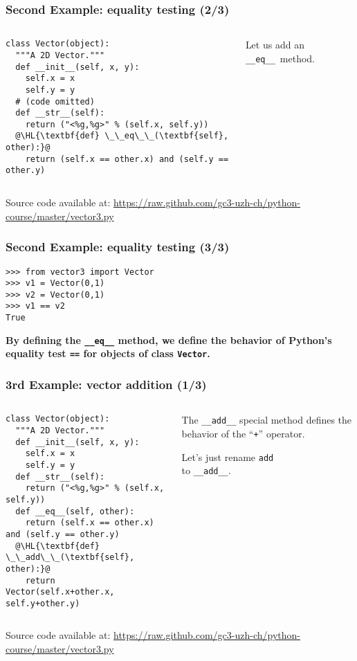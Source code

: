 \documentclass[english,serif,mathserif,xcolor=pdftex,dvipsnames,table]{beamer}
\begin{document}
\begin{frame}[fragile]
  \frametitle{Second Example: equality testing (2/3)}
  \begin{columns}[t]
    \begin{column}{0.5\textwidth}
\begin{lstlisting}
class Vector(object):
  """A 2D Vector."""
  def __init__(self, x, y):
    self.x = x
    self.y = y
  # (code omitted)
  def __str__(self):
    return ("<%g,%g>" % (self.x, self.y))
  @\HL{\textbf{def} \_\_eq\_\_(\textbf{self}, other):}@
    return (self.x == other.x) and (self.y == other.y)
\end{lstlisting}
    \end{column}
    \begin{column}{0.5\textwidth}
      \raggedleft
      Let us add an \lstinline|__eq__|~method.
    \end{column}
  \end{columns}

  \+
  {\scriptsize Source code available at:
    \url{https://raw.github.com/gc3-uzh-ch/python-course/master/vector3.py}}
\end{frame}


\begin{frame}[fragile]
  \frametitle{Second Example: equality testing (3/3)}
\begin{lstlisting}
>>> from vector3 import Vector
>>> v1 = Vector(0,1)
>>> v2 = Vector(0,1)
>>> v1 == v2
True
\end{lstlisting}

  \+ {\bfseries By defining the \lstinline|__eq__| method, we
    define the behavior of Python's equality test \lstinline|==| for
    objects of class \texttt{Vector}.}
\end{frame}


\begin{frame}[fragile]
  \frametitle{3rd Example: vector addition (1/3)}
  \begin{columns}[t]
    \begin{column}{0.5\textwidth}
\begin{lstlisting}
class Vector(object):
  """A 2D Vector."""
  def __init__(self, x, y):
    self.x = x
    self.y = y
  def __str__(self):
    return ("<%g,%g>" % (self.x, self.y))
  def __eq__(self, other):
    return (self.x == other.x) and (self.y == other.y)
  @\HL{\textbf{def} \_\_add\_\_(\textbf{self}, other):}@
    return Vector(self.x+other.x, self.y+other.y)
\end{lstlisting}
    \end{column}
    \begin{column}{0.5\textwidth}
      \raggedleft
      The \lstinline|__add__| special method defines the behavior of the
      ``\texttt{+}'' operator.

      \+
      Let's just rename \texttt{add} \\ to \texttt{\_\_add\_\_}.
    \end{column}
  \end{columns}

  \+
  {\scriptsize Source code available at:
    \url{https://raw.github.com/gc3-uzh-ch/python-course/master/vector3.py}}
\end{frame}
\end{document}
